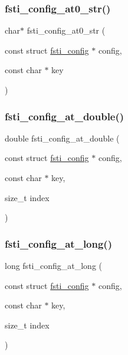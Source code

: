 \mbox{\label{fsti-config_8c_a50a8eef9690263f45e229ce63cdefbfc}} 
\subsubsection{\texorpdfstring{fsti\+\_\+config\+\_\+at0\+\_\+str()}{fsti\_config\_at0\_str()}}
{\footnotesize\ttfamily char$\ast$ fsti\+\_\+config\+\_\+at0\+\_\+str (\begin{DoxyParamCaption}\item[{const struct \mbox{\hyperlink{structfsti__config}{fsti\+\_\+config}} $\ast$}]{config,  }\item[{const char $\ast$}]{key }\end{DoxyParamCaption})}

\mbox{\label{fsti-config_8c_a62f94d64fed8d92993151b3fcbfa6a3f}} 
\subsubsection{\texorpdfstring{fsti\+\_\+config\+\_\+at\+\_\+double()}{fsti\_config\_at\_double()}}
{\footnotesize\ttfamily double fsti\+\_\+config\+\_\+at\+\_\+double (\begin{DoxyParamCaption}\item[{const struct \mbox{\hyperlink{structfsti__config}{fsti\+\_\+config}} $\ast$}]{config,  }\item[{const char $\ast$}]{key,  }\item[{size\+\_\+t}]{index }\end{DoxyParamCaption})}

\mbox{\label{fsti-config_8c_a66e20fd6ac731a2183f5f303d9707058}} 
\subsubsection{\texorpdfstring{fsti\+\_\+config\+\_\+at\+\_\+long()}{fsti\_config\_at\_long()}}
{\footnotesize\ttfamily long fsti\+\_\+config\+\_\+at\+\_\+long (\begin{DoxyParamCaption}\item[{const struct \mbox{\hyperlink{structfsti__config}{fsti\+\_\+config}} $\ast$}]{config,  }\item[{const char $\ast$}]{key,  }\item[{size\+\_\+t}]{index }\end{DoxyParamCaption})}

